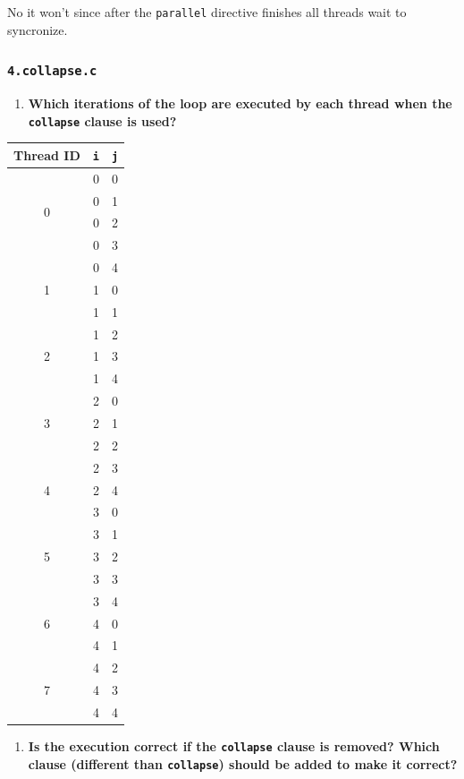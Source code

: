 \documentclass[a4paper]{article}
\begin{document}
No it won't since after the \verb|parallel| directive finishes all threads wait to syncronize.

\subsubsection{\texttt{4.collapse.c}}
\begin{enumerate}
	\item \textbf{Which iterations of the loop are executed by each thread when the \texttt{collapse} clause is used?}
\end{enumerate}

\begin{table}[H]
	\centering
	\begin{tabular}{crr}
		Thread ID & \verb|i| & \verb|j| \\
		\hline
		\multirow{4}{*}{0} & 0 & 0 \\
		& 0 & 1 \\
		& 0 & 2 \\
		& 0 & 3 \\
		\hline
		\multirow{3}{*}{1} & 0 & 4 \\
		& 1 & 0 \\
		& 1 & 1 \\
		\hline
		\multirow{3}{*}{2} & 1 & 2 \\
		& 1 & 3 \\
		& 1 & 4 \\
		\hline
		\multirow{3}{*}{3} & 2 & 0 \\
		& 2 & 1 \\
		& 2 & 2 \\
		\hline
		\multirow{3}{*}{4} & 2 & 3 \\
		& 2 & 4 \\
		& 3 & 0 \\
		\hline
		\multirow{3}{*}{5} & 3 & 1 \\
		& 3 & 2 \\
		& 3 & 3 \\
		\hline
		\multirow{3}{*}{6} & 3 & 4 \\
		& 4 & 0 \\
		& 4 & 1 \\
		\hline
		\multirow{3}{*}{7} & 4 & 2 \\
		& 4 & 3 \\
		& 4 & 4 \\
	\end{tabular}
\end{table}

\begin{enumerate}[resume]
	\item \textbf{Is the execution correct if the \texttt{collapse} clause is removed? Which clause (different than \texttt{collapse}) should be added to make it correct?}
\end{enumerate}
\end{document}
